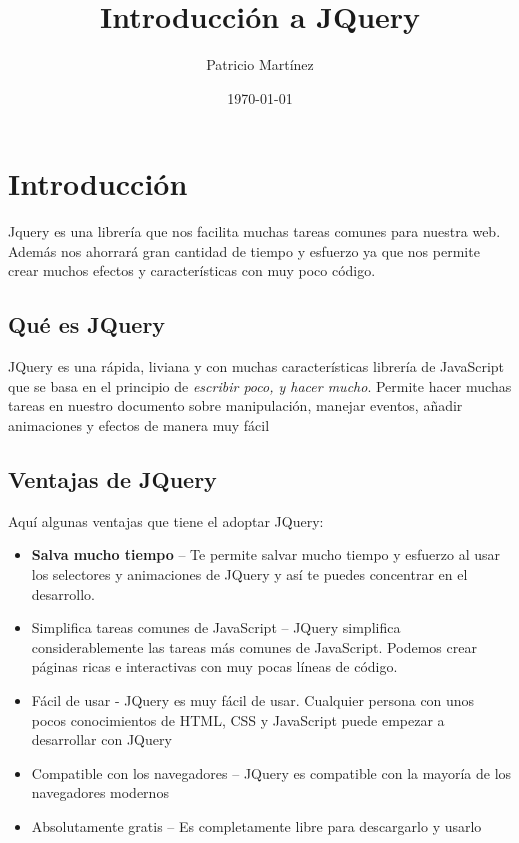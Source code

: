 \documentclass[11pt]{article}
\author{Patricio Martínez}
\date{\today}
\title{Introducción a JQuery}
\begin{document}
\maketitle
\tableofcontents


\section*{Introducción}
\label{sec:org8a2f91e}

Jquery es una librería que nos facilita muchas tareas comunes para nuestra web. Además nos ahorrará gran cantidad de tiempo y esfuerzo ya que nos permite crear muchos efectos y características con muy poco código.

\subsection*{Qué es JQuery}
\label{sec:orgc12639f}

JQuery es una rápida, liviana y con muchas características librería de JavaScript que se basa en el principio de \emph{escribir poco, y hacer mucho}. Permite hacer muchas tareas en nuestro documento sobre manipulación, manejar eventos, añadir animaciones y efectos de manera muy fácil

\subsection*{Ventajas de JQuery}
\label{sec:org62c0047}

Aquí algunas ventajas que tiene el adoptar JQuery:

\begin{itemize}
\item \textbf{Salva mucho tiempo} -- Te permite salvar mucho tiempo y esfuerzo al usar los selectores y animaciones de JQuery y así te puedes concentrar en el desarrollo.
\item Simplifica tareas comunes de JavaScript -- JQuery simplifica considerablemente las tareas más comunes de JavaScript. Podemos crear páginas ricas e interactivas con muy pocas líneas de código.
\item Fácil de usar - JQuery es muy fácil de usar. Cualquier persona con unos pocos conocimientos de HTML, CSS y JavaScript puede empezar a desarrollar con JQuery
\item Compatible con los navegadores -- JQuery es compatible con la mayoría de los navegadores modernos
\item Absolutamente gratis -- Es completamente libre para descargarlo y usarlo
\end{itemize}
\end{document}
